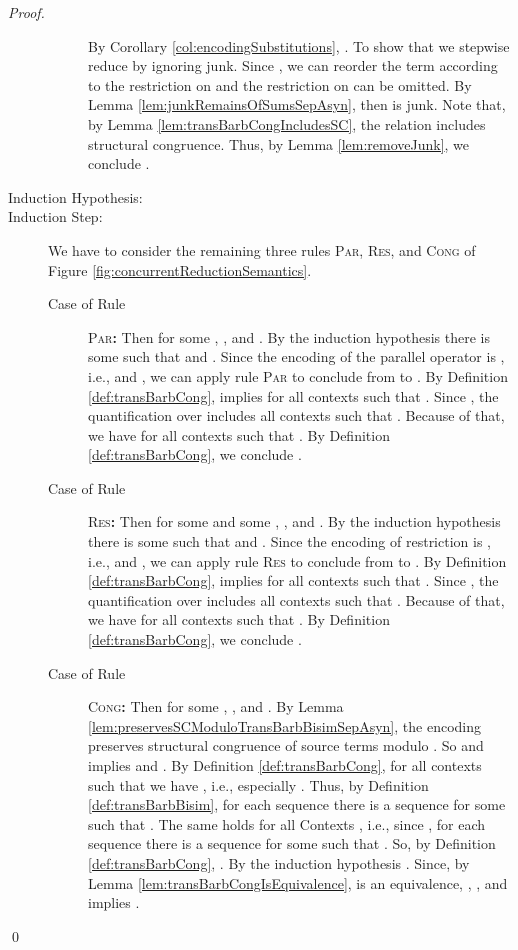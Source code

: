 \documentclass[]{llncs}
\begin{document}
\begin{proof}
\begin{description}
\begin{description}
					By Corollary \ref{col:encodingSubstitutions}, . To show that  we stepwise reduce  by ignoring junk. Since , we can reorder the term according to the restriction on  and the restriction on  can be omitted. By Lemma \ref{lem:junkRemainsOfSumsSepAsyn}, then  is junk. Note that, by Lemma \ref{lem:transBarbCongIncludesSC}, the relation  includes structural congruence. Thus, by Lemma \ref{lem:removeJunk}, we conclude .
			\end{description}
		\item[Induction Hypothesis:] 
		\item[Induction Step:] We have to consider the remaining three rules \textsc{Par}, \textsc{Res}, and \textsc{Cong} of Figure \ref{fig:concurrentReductionSemantics}.
			\begin{description}
				\item[Case of Rule] \textsc{Par}\textbf{:} Then  for some , , and . By the induction hypothesis there is some  such that  and . Since the encoding of the parallel operator is \clean, i.e.,  and , we can apply rule \textsc{Par} to conclude from  to . By Definition \ref{def:transBarbCong},  implies  for all contexts  such that . Since , the quantification over  includes all contexts  such that . Because of that, we have  for all contexts  such that . By Definition \ref{def:transBarbCong}, we conclude .
				\item[Case of Rule] \textsc{Res}\textbf{:} Then  for some  and some , , and . By the induction hypothesis there is some  such that  and . Since the encoding of restriction is \clean, i.e.,  and , we can apply rule \textsc{Res} to conclude from  to . By Definition \ref{def:transBarbCong},  implies  for all contexts  such that . Since , the quantification over  includes all contexts  such that . Because of that, we have  for all contexts  such that . By Definition \ref{def:transBarbCong}, we conclude .
				\item[Case of Rule] \textsc{Cong}\textbf{:} Then  for some , , and . By Lemma \ref{lem:preservesSCModuloTransBarbBisimSepAsyn}, the encoding  preserves structural congruence of source terms modulo . So  and  implies  and . By Definition \ref{def:transBarbCong}, for all contexts  such that  we have , i.e., especially . Thus, by Definition \ref{def:transBarbBisim}, for each sequence  there is a sequence  for some  such that . The same holds for all Contexts , i.e., since , for each sequence  there is a sequence  for some  such that . So, by Definition \ref{def:transBarbCong}, . By the induction hypothesis . Since, by Lemma \ref{lem:transBarbCongIsEquivalence},  is an equivalence, , , and  implies .
			\end{description}
	\end{description}
	\qed
\end{proof}
\end{document}
